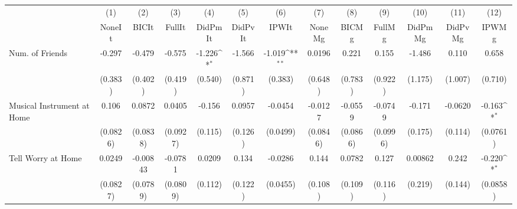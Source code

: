 {
\def\sym#1{\ifmmode^{#1}\else\(^{#1}\)\fi}
\begin{tabular}{l*{12}{c}}
\toprule
            &\multicolumn{1}{c}{(1)}&\multicolumn{1}{c}{(2)}&\multicolumn{1}{c}{(3)}&\multicolumn{1}{c}{(4)}&\multicolumn{1}{c}{(5)}&\multicolumn{1}{c}{(6)}&\multicolumn{1}{c}{(7)}&\multicolumn{1}{c}{(8)}&\multicolumn{1}{c}{(9)}&\multicolumn{1}{c}{(10)}&\multicolumn{1}{c}{(11)}&\multicolumn{1}{c}{(12)}\\
            &\multicolumn{1}{c}{NoneIt}&\multicolumn{1}{c}{BICIt}&\multicolumn{1}{c}{FullIt}&\multicolumn{1}{c}{DidPmIt}&\multicolumn{1}{c}{DidPvIt}&\multicolumn{1}{c}{IPWIt}&\multicolumn{1}{c}{NoneMg}&\multicolumn{1}{c}{BICMg}&\multicolumn{1}{c}{FullMg}&\multicolumn{1}{c}{DidPmMg}&\multicolumn{1}{c}{DidPvMg}&\multicolumn{1}{c}{IPWMg}\\
\midrule
Num. of Friends&      -0.297         &      -0.479         &      -0.575         &      -1.226\sym{*}  &      -1.566         &      -1.019\sym{**} &      0.0196         &       0.221         &       0.155         &      -1.486         &       0.110         &       0.658         \\
            &     (0.383)         &     (0.402)         &     (0.419)         &     (0.540)         &     (0.871)         &     (0.383)         &     (0.648)         &     (0.783)         &     (0.922)         &     (1.175)         &     (1.007)         &     (0.710)         \\
\addlinespace
Musical Instrument at Home&       0.106         &      0.0872         &      0.0405         &      -0.156         &      0.0957         &     -0.0454         &     -0.0127         &     -0.0559         &     -0.0749         &      -0.171         &     -0.0620         &      -0.163\sym{*}  \\
            &    (0.0826)         &    (0.0838)         &    (0.0927)         &     (0.115)         &     (0.126)         &    (0.0499)         &    (0.0846)         &    (0.0866)         &    (0.0996)         &     (0.175)         &     (0.114)         &    (0.0761)         \\
\addlinespace
Tell Worry at Home&      0.0249         &    -0.00843         &     -0.0781         &      0.0209         &       0.134         &     -0.0286         &       0.144         &      0.0782         &       0.127         &     0.00862         &       0.242         &      -0.220\sym{*}  \\
            &    (0.0827)         &    (0.0789)         &    (0.0809)         &     (0.112)         &     (0.122)         &    (0.0455)         &     (0.108)         &     (0.109)         &     (0.116)         &     (0.219)         &     (0.144)         &    (0.0858)         \\

\end{tabular}}
